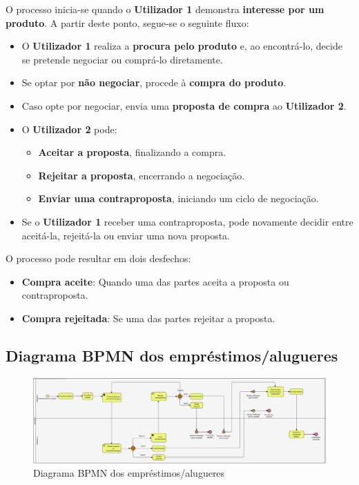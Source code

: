 \documentclass[a4paper, 12pt]{article} %
\begin{document}
O processo inicia-se quando o \textbf{Utilizador 1} demonstra \textbf{interesse por um produto}. A partir deste ponto, segue-se o seguinte fluxo:

\begin{itemize}
	\item O \textbf{Utilizador 1} realiza a \textbf{procura pelo produto} e, ao encontrá-lo, decide se pretende negociar ou comprá-lo diretamente.
	\item Se optar por \textbf{não negociar}, procede à \textbf{compra do produto}.
	\item Caso opte por negociar, envia uma \textbf{proposta de compra} ao \textbf{Utilizador 2}.
	\item O \textbf{Utilizador 2} pode:
	\begin{itemize}
		\item \textbf{Aceitar a proposta}, finalizando a compra.
		\item \textbf{Rejeitar a proposta}, encerrando a negociação.
		\item \textbf{Enviar uma contraproposta}, iniciando um ciclo de negociação.
	\end{itemize}
	\item Se o \textbf{Utilizador 1} receber uma contraproposta, pode novamente decidir entre aceitá-la, rejeitá-la ou enviar uma nova proposta.
\end{itemize}


O processo pode resultar em dois desfechos:
\begin{itemize}
	\item \textbf{Compra aceite}: Quando uma das partes aceita a proposta ou contraproposta.
	\item \textbf{Compra rejeitada}: Se uma das partes rejeitar a proposta.
\end{itemize}

\subsection{Diagrama BPMN dos empréstimos/alugueres}

\begin{figure}[ht]
	\centering
	\includegraphics[width=\textwidth]{../images/bpmn-rentals.png}
	\caption{Diagrama BPMN dos empréstimos/alugueres}
	\label{fig:bpmn emprestimo/aluguer}
\end{figure}
\end{document}
